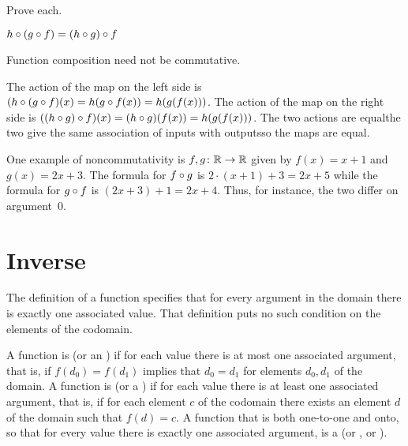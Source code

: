 \documentclass{ibl}  %
\begin{document}
\begin{ex} Prove each.
\begin{exes}
\item{} 
  $h\mathbin{\circ} (g\mathbin{\circ} f)=(h\mathbin{\circ} g)\mathbin{\circ} f$    
\item Function composition need not be commutative.
\end{exes}
\begin{ans}
\begin{exes}
\item The action of the map on the left side
  is $(h\mathbin{\circ} (g\mathbin{\circ} f)(x)=h(g\mathbin{\circ} f(x))
       =h(g(f(x)))$.
  The action of the map on the right side  
  is $((h\mathbin{\circ} g)\mathbin{\circ} f)(x)=(h\mathbin{\circ} g)(f(x))
      =h(g(f(x)))$.
  The two actions are equal\Dash the two give the same association of inputs
  with outputs\Dash so the maps are equal.
\item One example of noncommutativity is $\mbox{$f,g\colon \mathbb{R}\to \mathbb{R}$}$ given by 
  $f(x)=x+1$ and $g(x)=2x+3$.
  The formula for $f\mathbin{\circ} g$ is $2\cdot(x+1)+3=2x+5$ while
  the formula for $g\mathbin{\circ} f$ is $(2x+3)+1=2x+4$.
  Thus, for instance, the two differ on argument~$0$.
\end{exes}
\end{ans}
\end{ex}





\section{Inverse}

The definition of a function specifies that for every argument in the
domain there is 
exactly one associated value.
That definition puts no such condition on the elements of the codomain.

\begin{df}
A function is  (or an ) 
if for each value there is at most
one associated argument, that is, if $f(d_0)=f(d_1)$ implies that $d_0=d_1$
for elements $d_0,d_1$ of the domain.
A function is  (or a ) 
if for each value there is at least
one associated argument, that is, if for each element $c$ of the codomain
there exists an element $d$ of the domain such that $f(d)=c$.
A function that is both one-to-one and onto, so that for every value there
is exactly one associated argument, is a 
 (or , or ).
\end{df}
\end{document}
